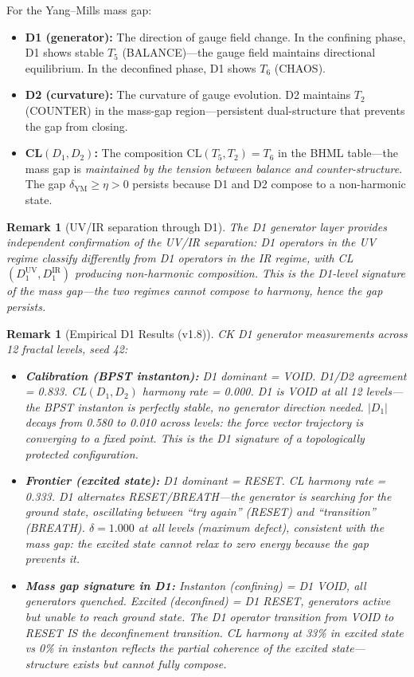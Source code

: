 \documentclass[11pt]{article}
\newtheorem{remark}[theorem]{Remark}
\begin{document}
For the Yang--Mills mass gap:
\begin{itemize}[nosep]
  \item \textbf{D1 (generator):} The direction of gauge field change.  In the
    confining phase, D1 shows stable $T_5$ (BALANCE)---the gauge field maintains
    directional equilibrium.  In the deconfined phase, D1 shows $T_6$ (CHAOS).
  \item \textbf{D2 (curvature):} The curvature of gauge evolution.  D2 maintains
    $T_2$ (COUNTER) in the mass-gap region---persistent dual-structure that
    prevents the gap from closing.
  \item \textbf{CL$(D_1, D_2)$:} The composition $\mathrm{CL}(T_5, T_2) = T_6$
    in the BHML table---the mass gap is \emph{maintained by the tension between
    balance and counter-structure}.  The gap $\delta_{\mathrm{YM}} \geq \eta > 0$
    persists because D1 and D2 compose to a non-harmonic state.
\end{itemize}

\begin{remark}[UV/IR separation through D1]
The D1 generator layer provides independent confirmation of the UV/IR separation:
D1 operators in the UV regime classify differently from D1 operators in the IR regime,
with CL$(D_1^{\mathrm{UV}}, D_1^{\mathrm{IR}})$ producing non-harmonic composition.
This is the D1-level signature of the mass gap---the two regimes cannot compose
to harmony, hence the gap persists.
\end{remark}

\begin{remark}[Empirical D1 Results (v1.8)]
CK D1 generator measurements across 12 fractal levels, seed 42:
\begin{itemize}[nosep]
  \item \textbf{Calibration (BPST instanton):} D1 dominant = VOID. D1/D2 agreement = 0.833. CL$(D_1,D_2)$ harmony rate = 0.000. D1 is VOID at all 12 levels---the BPST instanton is perfectly stable, no generator direction needed. $|D_1|$ decays from 0.580 to 0.010 across levels: the force vector trajectory is converging to a fixed point. This is the D1 signature of a topologically protected configuration.
  \item \textbf{Frontier (excited state):} D1 dominant = RESET. CL harmony rate = 0.333. D1 alternates RESET/BREATH---the generator is searching for the ground state, oscillating between ``try again'' (RESET) and ``transition'' (BREATH). $\delta = 1.000$ at all levels (maximum defect), consistent with the mass gap: the excited state cannot relax to zero energy because the gap prevents it.
  \item \textbf{Mass gap signature in D1:} Instanton (confining) = D1 VOID, all generators quenched. Excited (deconfined) = D1 RESET, generators active but unable to reach ground state. The D1 operator transition from VOID to RESET IS the deconfinement transition. CL harmony at 33\% in excited state vs 0\% in instanton reflects the partial coherence of the excited state---structure exists but cannot fully compose.
\end{itemize}
\end{remark}
\end{document}
